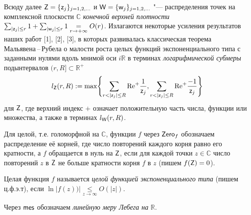 
\vzmscaption



Всюду далее $ {\sf Z}= \{{\sf z}_j\}_{j=1,2, \dots}$ и ${\sf W}= \{{\sf w}_{j}\}_{j=1,2, \dots}$ "---    распределения точек на комплексной плоскости  $ \mathbb C$ {\it конечной верхней плотности\/} $\sum_{|{\sf z}_j|\leq r}1+\sum_{|{\sf w}_j|\leq r}1\underset{r\to +\infty}{=}O(r)$.
Излагаются некоторые усиления результатов наших работ [1], [2], [3], в которых развивалась классическая теорема Мальявена\,--\,Рубела о малости роста целых функций экспоненциального типа с заданными нулями  вдоль мнимой оси $i\mathbb R$ в терминах
{\it логарифмической субмеры} подынтервалов $(r,R]\subset \mathbb R^+$
\begin{equation*}%
l_{\sf Z} (r,R):=
\max \Biggl\{\sum_{r< |{\sf z}_j|\leq R} {\rm Re}^+ \frac{1}{{\sf z}_j},
\sum_{r < |{\sf z}_j|\leq R} {\rm Re}^+ \frac{-1}{{\sf z}_j}\Biggr\}
\end{equation*}
для ${\sf Z}$, где верхний индекс $+$ означает положительную часть числа, функции или множества, а также в терминах $l_{\sf W} (r,R)$.

Для целой, т.е. голоморфной на $\mathbb C$, функции $f$ через ${\sf Zero}_f$ обозначаем распределение её корней, где число повторений каждого корня равно его кратности, а $f$ обращается в нуль на ${\sf Z}$, если для каждой точки $z\in \mathbb C$ число повторений  $z$ в ${\sf Z}$ не больше кратности корня $f$ в $z$ (пишем $f({\sf Z})=0$).

Целая функция $f$ называется {\it целой функцией экспоненциального типа} (пишем ц.ф.э.т), если $\ln |f(z))|\underset{z\to \infty}{\leq} O(|z|)$.

Через $\sf mes$ обозначаем {\it линейную меру Лебега на\/} $\mathbb R$.
